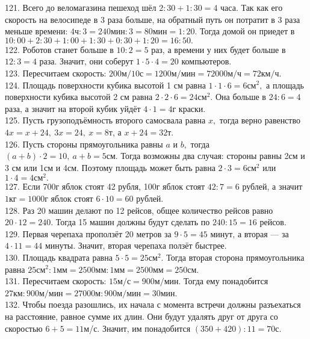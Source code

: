 121. Всего до веломагазина пешеход шёл $2:30+1:30=4$ часа. Так как его скорость на велосипеде в 3 раза больше, на обратный путь он потратит в 3 раза меньше времени: $4\text{ч}:3=240\text{мин}:3=80\text{мин}=1:20.$ Тогда домой он приедет в $10:00+2:30+1:00+1:30+0:30+1:20=16:50.$\\
122. Роботов станет больше в $10:2=5$ раз, а времени у них будет больше в $12:3=4$ раза. Значит, они соберут $1\cdot5\cdot4=20$ компьютеров.\\
123. Пересчитаем скорость: $200\text{м}/10\text{с}=1200\text{м}/\text{мин}=72000\text{м}/\text{ч}=72\text{км}/\text{ч}.$\\
124. Площадь поверхности кубика высотой 1 см равна $1\cdot1\cdot6=6\text{см}^2,$ а площадь поверхности кубика высотой 2 см равна $2\cdot2\cdot6=24\text{см}^2.$ Она больше в $24:6=4$ раза, а значит на второй кубик уйдёт $4\cdot1=4$г краски.\\
125. Пусть грузоподъёмность второго самосвала равна $x,$ тогда верно равенство $4x=x+24,\ 3x=24,\ x=8$т, а $x+24=32$т.\\
126. Пусть стороны прямоугольника равны $a$ и $b,$ тогда $(a+b)\cdot2=10,\ a+b=5$см. Тогда возможны два случая: стороны равны 2см и 3 см или 1см и 4см. Поэтому площадь может быть равна $2\cdot3=6\text{см}^2$ или $1\cdot4=4\text{см}^2.$\\
127. Если 700г яблок стоят 42 рубля, 100г яблок стоят $42:7=6$ рублей, а значит $1\text{кг}=1000$г яблок стоят $6\cdot10=60$ рублей.\\
128. Раз 20 машин делают по 12 рейсов, общее количество рейсов равно $20\cdot12=240.$ Тогда 15 машин должны будут сделать по $240:15=16$ рейсов.\\
129. Первая черепаха проползёт 20 метров за $9\cdot5=45$ минут, а вторая --- за $4\cdot11=44$ минуты. Значит, вторая черепаха ползёт быстрее.\\
130. Площадь квадрата равна $5\cdot5=25\text{см}^2.$ Тогда вторая сторона прямоугольника равна $25\text{см}^2:1\text{мм}=2500\text{мм}:1\text{мм}=2500\text{мм}=250\text{см}.$\\
131. Пересчитаем скорость: $15\text{м}/\text{с}=900\text{м}/\text{мин}.$ Тогда ему понадобится $27\text{км}:900\text{м}/\text{мин}=
27000\text{м}:900\text{м}/\text{мин}=30$мин.\\
132. Чтобы поезда разошлись, их начала с момента встречи должны разъехаться на расстояние, равное сумме их длин. Они будут удалять друг от друга со скоростью $6+5=11$м/с. Значит, им понадобится $(350+420):11=70$с.\\
